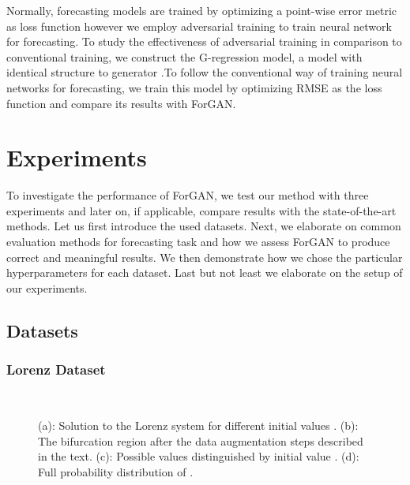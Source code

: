 \documentclass{ieeeaccess}
\begin{document}
Normally, forecasting models are trained by optimizing a point-wise error metric as loss function however we employ adversarial training to train neural network for forecasting. To study the effectiveness of adversarial training in comparison to conventional training, we construct the G-regression model, a model with identical structure to generator .To follow the conventional way of training neural networks for forecasting, we train this model by optimizing RMSE as the loss function and compare its results with ForGAN.


\section{Experiments}
\label{sec:experiments}
To investigate the performance of ForGAN, we test our method with three experiments and later on, if applicable, compare results with the state-of-the-art methods. Let us first introduce the used datasets. Next, we elaborate on common evaluation methods for forecasting task and how we assess ForGAN to produce correct and meaningful results. We then demonstrate how we chose the particular hyperparameters for each dataset. Last but not least we elaborate on the setup of our experiments.

\subsection{Datasets}
\subsubsection{Lorenz Dataset}

\begin{figure*}[t]
	\centering
	\hfill
	\\
	\hfill
	\caption{(a): Solution to the Lorenz system for different initial values . (b): The bifurcation region after the data augmentation steps described in the text. (c): Possible values  distinguished by initial value . (d): Full probability distribution of .}
	\label{fig:lorenz} 
\end{figure*}
\end{document}
